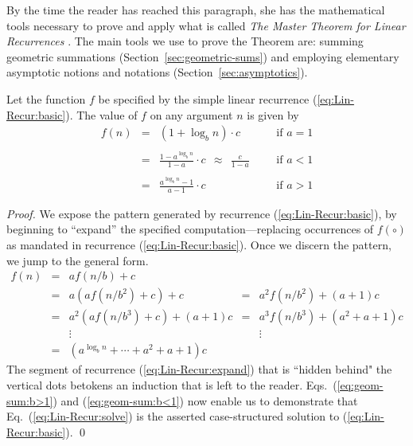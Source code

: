 \medskip

By the time the reader has reached this paragraph, she has the mathematical tools necessary to prove and apply what is called {\it The Master Theorem for Linear Recurrences} \cite{CLRS}.  The main tools we use to prove the Theorem are: summing geometric summations (Section~\ref{sec:geometric-sums}) and employing elementary asymptotic notions and notations (Section~\ref{sec:asymptotics}).

\begin{theorem}
\label{thm:master-thm-simple}
Let the function $f$ be specified by the simple linear recurrence (\ref{eq:Lin-Recur:basic}).  The value of $f$ on any argument $n$ is given by
\begin{equation}
\label{eq:Lin-Recur:solve}
\begin{array}{lcllll}
f(n) & = & (1 + \log_b n) \cdot c &  &  & \mbox{if } a=1 \\
      &    &                 &  &  & \\
      & = &
  {\displaystyle
  \frac{1-a^{\log_b n}}{1-a} \cdot c \ \ \approx \ \ \frac{c}{1-a}
  }
                               &  &  & \mbox{if } a<1 \\
    &   &                   &  &  & \\
    & = &
  {\displaystyle
\frac{a^{\log_b n} -1}{a-1} \cdot c
  }
                             &  &  & \mbox{if } a>1
\end{array}
\end{equation}
\end{theorem}

\begin{proof}
We expose the pattern generated by recurrence (\ref{eq:Lin-Recur:basic}), by beginning to ``expand'' the specified computation---replacing occurrences of $f(\circ)$ as mandated in recurrence (\ref{eq:Lin-Recur:basic}).  Once we discern the pattern, we jump to the general form.
\begin{equation}
\label{eq:Lin-Recur:expand}
\begin{array}{lcccc}
f(n) & = & a f(n/b) + c & & \\
     & = & a \left( a f(n/b^2) + c \right) + c
             & = & a^2 f(n/b^2) + (a+1)c \\
     & = & a^2 \left( a f(n/b^3) + c \right) + (a+1)c
             & = & a^3 f(n/b^3) + (a^2+a+1)c \\
     &   & \vdots & & \vdots \\
     & = & 
{\displaystyle
\left(a^{\log_b n} + \cdots +a^2+a+1 \right) c
} & &
\end{array}
\end{equation}
The segment of recurrence (\ref{eq:Lin-Recur:expand}) that is ``hidden behind" the vertical dots betokens an induction that is left to the reader.  Eqs.~(\ref{eq:geom-sum:b>1}) and (\ref{eq:geom-sum:b<1}) now enable us to demonstrate that Eq.~(\ref{eq:Lin-Recur:solve}) is the asserted case-structured solution to (\ref{eq:Lin-Recur:basic}).  \qed
\end{proof}



